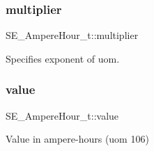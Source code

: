\subsubsection{\texorpdfstring{multiplier}{multiplier}}
{\footnotesize\ttfamily S\+E\+\_\+\+Ampere\+Hour\+\_\+t\+::multiplier}

Specifies exponent of uom. \mbox{\label{group__AmpereHour_gabdf24e7f494b6811f2c47bf098afd789}} 
\subsubsection{\texorpdfstring{value}{value}}
{\footnotesize\ttfamily S\+E\+\_\+\+Ampere\+Hour\+\_\+t\+::value}

Value in ampere-\/hours (uom 106) 